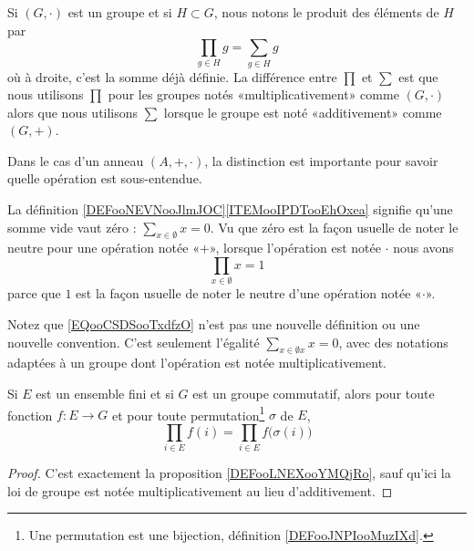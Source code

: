 \begin{normaltext}      \label{NORMooDBOFooQCwbOY}
	Si \( (G,\cdot)\) est un groupe et si \( H\subset G\), nous notons le produit des éléments de \( H\) par
	\begin{equation}
		\prod_{g\in H }g=\sum_{g\in H}g
	\end{equation}
	où à droite, c'est la somme déjà définie. La différence entre \( \prod\) et \( \sum\) est que nous utilisons \( \prod\) pour les groupes notés «multiplicativement» comme \( (G,\cdot)\) alors que nous utilisons \( \sum\) lorsque le groupe est noté «additivement» comme \( (G,+)\).

	Dans le cas d'un anneau \( (A,+,\cdot)\), la distinction est importante pour savoir quelle opération est sous-entendue.

	La définition \ref{DEFooNEVNooJlmJOC}\ref{ITEMooIPDTooEhOxea} signifie qu'une somme vide vaut zéro : \( \sum_{x\in \emptyset}x=0\). Vu que zéro est la façon usuelle de noter le neutre pour une opération notée «\( +\)», lorsque l'opération est notée \( \cdot\) nous avons
	\begin{equation}        \label{EQooCSDSooTxdfzO}
		\prod_{x\in\emptyset}x=1
	\end{equation}
	parce que \( 1\) est la façon usuelle de noter le neutre d'une opération notée «\( \cdot\)».

	Notez que \eqref{EQooCSDSooTxdfzO} n'est pas une nouvelle définition ou une nouvelle convention. C'est seulement l'égalité \( \sum_{x\in\emptyset x}x=0\), avec des notations adaptées à un groupe dont l'opération est notée multiplicativement.
\end{normaltext}

\begin{proposition}     \label{PROPooQMUDooQQVRIe}
	Si \( E\) est un ensemble fini et si \( G\) est un groupe commutatif, alors pour toute fonction \( f\colon E\to G\) et pour toute permutation\footnote{Une permutation est une bijection, définition \ref{DEFooJNPIooMuzIXd}.} \( \sigma\) de \( E\),
	\begin{equation}
		\prod_{i\in E}f(i)=\prod_{i\in E}f\big( \sigma(i) \big)
	\end{equation}
\end{proposition}

\begin{proof}
	C'est exactement la proposition \ref{DEFooLNEXooYMQjRo}, sauf qu'ici la loi de groupe est notée multiplicativement au lieu d'additivement.
\end{proof}

